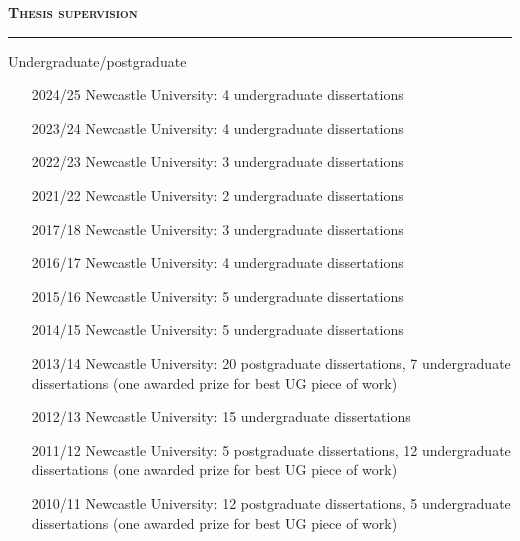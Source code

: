 \documentclass[10pt,pdftex,a4paper,oneside]{article}
\begin{document}
\textbf{\textsc{Thesis supervision}}
\vspace{.5ex}
\hrule
Undergraduate/postgraduate
\begin{itemize}[noitemsep,nolistsep]
\item[2024/25] Newcastle University: 4 undergraduate dissertations
\item[2023/24] Newcastle University: 4 undergraduate dissertations
\item[2022/23] Newcastle University: 3 undergraduate dissertations
\item[2021/22] Newcastle University: 2 undergraduate dissertations
\item[2017/18] Newcastle University: 3 undergraduate dissertations
\item[2016/17] Newcastle University: 4 undergraduate dissertations
\item[2015/16] Newcastle University: 5 undergraduate dissertations
\item[2014/15] Newcastle University: 5 undergraduate dissertations
\item[2013/14] Newcastle University: 20 postgraduate dissertations, 7 undergraduate dissertations (one awarded prize for best UG piece of work)
\item[2012/13] Newcastle University: 15 undergraduate dissertations
\item[2011/12] Newcastle University: 5 postgraduate dissertations, 12 undergraduate dissertations (one awarded prize for best UG piece of work)
\item[2010/11] Newcastle University: 12 postgraduate dissertations, 5 undergraduate dissertations (one awarded prize for best UG piece of work)
\end{itemize}
\end{document}
